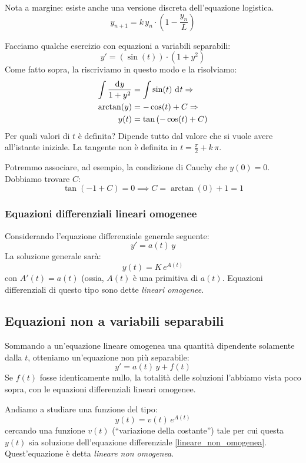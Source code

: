 \begin{exmp}
Nota a margine: esiste anche una versione discreta dell'equazione logistica.
\[
y_{n+1} = k \, y_n \cdot \left( 1 - \frac{y_n}{L} \right)
\]
\end{exmp}

Facciamo qualche esercizio con equazioni a variabili separabili:
\[
y' = ( \sin (t) ) \cdot (1 + y^2)
\]
Come fatto sopra, la riscriviamo in questo modo e la risolviamo:
\begin{align*}
\int \frac{\diff y}{1+y^2} &= \int \sin (t) \dx[t] \implies \\
\arctan (y) &= - \cos(t) + C \implies \\
y(t) &= \tan \left( -\cos(t) + C \right)
\end{align*}
Per quali valori di $t$ \`e definita? Dipende tutto dal valore che si vuole avere all'istante iniziale. La tangente non \`e definita in $t = \frac{\pi}{2} + k \, \pi$.

Potremmo associare, ad esempio, la condizione di Cauchy che $y(0) = 0$. Dobbiamo trovare $C$:
\[
\tan \left( -1 + C \right) = 0 \implies C = \arctan ( 0 ) + 1 = 1
\]
\subsubsection{Equazioni differenziali lineari omogenee}

Considerando l'equazione differenziale generale seguente:
\[
y' = a(t) \, y
\]
La soluzione generale sar\`a:
\[
y(t) = K \, e^{A(t)}
\]
con $A'(t) = a(t)$ (ossia, $A(t)$ \`e una primitiva di $a(t)$. Equazioni differenziali di questo tipo sono dette \emph{lineari omogenee}.

\subsection{Equazioni non a variabili separabili}

Sommando a un'equazione lineare omogenea una quantit\`a dipendente solamente dalla $t$, otteniamo un'equazione non pi\`u separabile:
\begin{equation}
\label{lineare_non_omogenea}
y' = a(t) \, y + f(t)
\end{equation}
Se $f(t)$ fosse identicamente nullo, la totalit\`a delle soluzioni l'abbiamo vista poco sopra, con le equazioni differenziali lineari omogenee.

Andiamo a studiare una funzione del tipo:
\begin{equation}
\label{variazione_costante}
y(t) = v(t) \, e^{A(t)}
\end{equation}
cercando una funzione $v(t)$ (``variazione della costante'') tale per cui questa $y(t)$ sia soluzione dell'equazione differenziale \ref{lineare_non_omogenea}. Quest'equazione \`e detta \emph{lineare non omogenea}.

